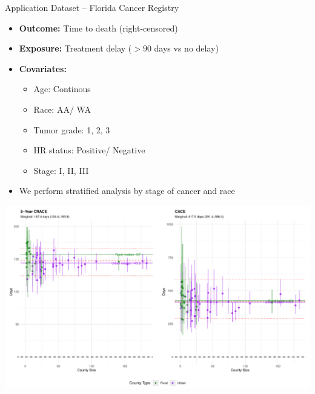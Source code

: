 \documentclass{beamer}
\begin{document}
\begin{frame}{Application Dataset – Florida Cancer Registry}
    \begin{itemize}
      \vfill \item \textbf{Outcome:} Time to death (right-censored)
      \vfill \item \textbf{Exposure:} Treatment delay (\(>90\) days vs no delay)
      \vfill \item \textbf{Covariates:}
      \begin{itemize}
        \vfill \item Age: Continous
        \vfill \item Race: AA/ WA 
        \vfill \item Tumor grade: 1, 2, 3
        \vfill \item HR status: Positive/ Negative
        \vfill \item Stage:  I, II, III
      
        
       
      \end{itemize}
      \vfill \item We perform stratified analysis by stage of cancer and race
    \end{itemize}
    \end{frame}
  


  \begin{frame}{}
    \includegraphics[width=\textwidth]{pics/CRACE_RACE_VS_SIZE.pdf}
  
  \end{frame}
\end{document}

